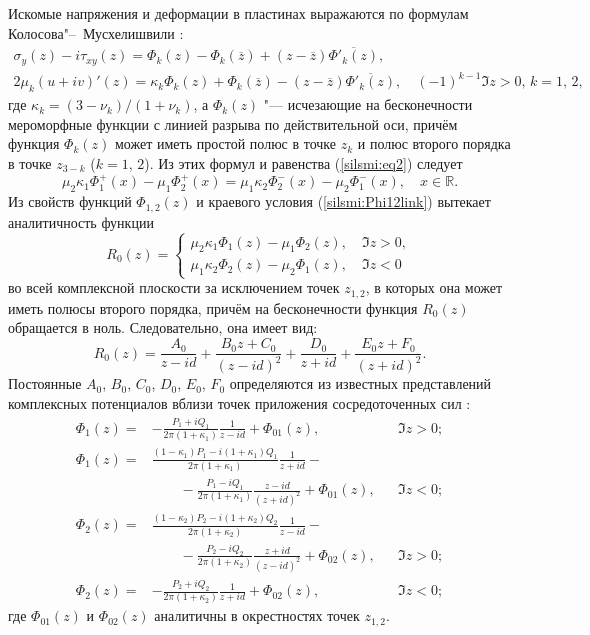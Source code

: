 Искомые напряжения и деформации в пластинах выражаются по формулам Колосова"--~Мусхелишвили \cite{silsmi:bib:mushel}:
\begin{gather*}
\sigma_y(z)-i\tau_{xy}(z)=\Phi_k(z)-\Phi_k(\overline z)+(z-\overline z)\overline{\Phi'_k(z)},\\
2\mu_k(u+i v)'(z)=\kappa_k\Phi_k(z)+\Phi_k(\overline z)-(z-\overline z)\overline{\Phi'_k(z)},\quad (-1)^{k-1}\Im z>0,\, k=1,\,2,
\end{gather*}
где $\kappa_k=(3-\nu_k)/(1+\nu_k)$, а $\Phi_k(z)$ "--- исчезающие на бесконечности мероморфные функции с линией разрыва по
действительной оси, причём функция $\Phi_k(z)$ может иметь простой полюс в точке $z_k$ и полюс второго порядка в точке $z_{3-k}$
($k=1,\,2$). Из этих формул и равенства (\ref{silsmi:eq2}) следует
\begin{equation}
\label{silsmi:Phi12link} \mu_2\kappa_1 \Phi_1^+(x)-\mu_1\Phi_2^+(x)=\mu_1\kappa_2\Phi_2^-(x)-\mu_2\Phi_1^-(x),\quad
x\in\mathbb{R}.
\end{equation}
Из свойств функций $\Phi_{1,2}(z)$ и краевого условия (\ref{silsmi:Phi12link}) вытекает аналитичность функции
\begin{equation}
\label{silsmi:R0def}
R_0(z)=\begin{cases}
\mu_2\kappa_1\Phi_1(z)-\mu_1\Phi_2(z), \quad \Im z>0,\\
\mu_1\kappa_2\Phi_2(z)-\mu_2\Phi_1(z), \quad \Im z<0
\end{cases}
\end{equation}
во всей комплексной плоскости за исключением точек $z_{1,2}$, в которых она может иметь полюсы второго порядка, причём на
бесконечности функция $R_0(z)$ обращается в ноль. Следовательно, она имеет вид:
$$
R_0(z)=\frac{A_0}{z-id}+\frac{B_0z+C_0}{(z-id)^2}+\frac{D_0}{z+id}+\frac{E_0z+F_0}{(z+id)^2}.
$$
Постоянные $A_0$, $B_0$, $C_0$, $D_0$, $E_0$, $F_0$ определяются из известных представлений комплексных потенциалов вблизи точек
приложения сосредоточенных сил \cite{silsmi:bib:mushel}:
$$
\begin{aligned}
\Phi_1(z)=&-\frac{P_1+iQ_1}{2\pi(1+\kappa_1)}\frac1{z-id}+\Phi_{01}(z),& &\Im z>0; \\
\Phi_1(z)=&\frac{(1-\kappa_1)P_1-i(1+\kappa_1)Q_1}{2\pi(1+\kappa_1)}\frac1{z+id}-  & & \\
&\qquad  -\frac{P_1-iQ_1}{2\pi(1+\kappa_1)}\frac{z-id}{(z+id)^2}+\Phi_{01}(z),& &\Im z<0;\\
\Phi_2(z)=&\frac{(1-\kappa_2)P_2-i(1+\kappa_2)Q_2}{2\pi(1+\kappa_2)}\frac1{z-id}- & &\\&\qquad  -\frac{P_2-iQ_2}{2\pi(1+\kappa_2)}\frac{z+id}{(z-id)^2}+\Phi_{02}(z),& &\Im z>0;\\
\Phi_2(z)=&-\frac{P_2+iQ_2}{2\pi(1+\kappa_2)}\frac1{z+id}+\Phi_{02}(z),& &\Im z<0;
\end{aligned}
$$
где $\Phi_{01}(z)$ и $\Phi_{02}(z)$ аналитичны в окрестностях точек $z_{1,2}$.

